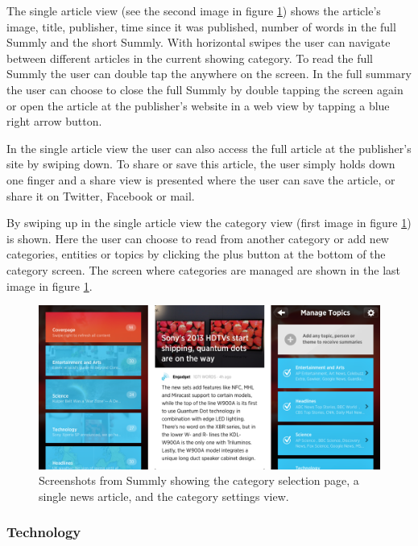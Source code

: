 The single article view (see the second image in figure \ref{screenshots_summly}) shows the article's image, title, publisher, time since it was published, number of words in the full Summly and the short Summly. With horizontal swipes the user can navigate between different articles in the current showing category. To read the full Summly the user can double tap the anywhere on the screen. In the full summary the user can choose to close the full Summly by double tapping the screen again or open the article at the publisher's website in a web view by tapping a blue right arrow button.

In the single article view the user can also access the full article at the publisher's site by swiping down. To share or save this article, the user simply holds down one finger and a share view is presented where the user can save the article, or share it on Twitter, Facebook or mail.

By swiping up in the single article view the category view (first image in figure \ref{screenshots_summly}) is shown. Here the user can choose to read from another category or add new categories, entities or topics by clicking the plus button at the bottom of the category screen. The screen where categories are managed are shown in the last image in figure \ref{screenshots_summly}.

\begin{figure}[!htbp]
\centering
\includegraphics[width=130mm]{GFX/screenshots/summly.png}
\caption{Screenshots from Summly showing the category selection page, a single news article, and the category settings view.}
\label{screenshots_summly}
\end{figure}

\subsubsection{Technology}

